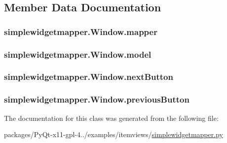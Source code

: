 \subsection{Member Data Documentation}
\hypertarget{classsimplewidgetmapper_1_1Window_ab78e5ce3c5d49a9a83775060015f5c7f}{}
\subsubsection[{mapper}]{\setlength{\rightskip}{0pt plus 5cm}simplewidgetmapper.\+Window.\+mapper}\label{classsimplewidgetmapper_1_1Window_ab78e5ce3c5d49a9a83775060015f5c7f}
\hypertarget{classsimplewidgetmapper_1_1Window_a796c39c52b77d212bef75ec2c946efdb}{}
\subsubsection[{model}]{\setlength{\rightskip}{0pt plus 5cm}simplewidgetmapper.\+Window.\+model}\label{classsimplewidgetmapper_1_1Window_a796c39c52b77d212bef75ec2c946efdb}
\hypertarget{classsimplewidgetmapper_1_1Window_a091914580ce25875826ab1b181a37c02}{}
\subsubsection[{next\+Button}]{\setlength{\rightskip}{0pt plus 5cm}simplewidgetmapper.\+Window.\+next\+Button}\label{classsimplewidgetmapper_1_1Window_a091914580ce25875826ab1b181a37c02}
\hypertarget{classsimplewidgetmapper_1_1Window_abe0c3d47c1b20f1accb91a7a4ab1d6a9}{}
\subsubsection[{previous\+Button}]{\setlength{\rightskip}{0pt plus 5cm}simplewidgetmapper.\+Window.\+previous\+Button}\label{classsimplewidgetmapper_1_1Window_abe0c3d47c1b20f1accb91a7a4ab1d6a9}


The documentation for this class was generated from the following file\+:\begin{DoxyCompactItemize}
\item 
packages/\+Py\+Qt-\/x11-\/gpl-\/4../examples/itemviews/\hyperlink{simplewidgetmapper_8py}{simplewidgetmapper.\+py}\end{DoxyCompactItemize}
